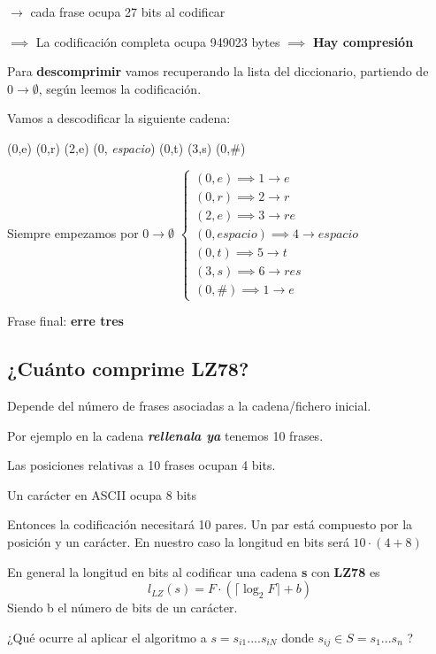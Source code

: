 $\rightarrow$  cada frase ocupa 27 bits al codificar

$\implies$ La codificación completa ocupa 949023 bytes $\implies$ \textbf{Hay compresión}

Para \textbf{descomprimir} vamos recuperando la lista del diccionario, partiendo de $0 \rightarrow \emptyset$, según leemos la codificación.

\begin{example}
Vamos a descodificar la siguiente cadena:

(0,e) (0,r) (2,e) (0, \textit{espacio}) (0,t) (3,s) (0,\#)

Siempre empezamos por $0 \rightarrow \emptyset$
$\begin{cases}
 (0,e) \implies 1 \rightarrow e\\
  (0,r) \implies 2 \rightarrow r\\ 
  (2,e) \implies 3 \rightarrow re\\
   (0, \textit{espacio}) \implies 4 \rightarrow \textit{espacio}\\
   (0,t) \implies 5 \rightarrow t\\
    (3,s) \implies 6 \rightarrow res\\
     (0,\#) \implies 1 \rightarrow e
\end{cases}$

Frase final: \textbf{erre tres}
\end{example}

\subsection{¿Cuánto comprime LZ78?}

Depende del número de frases asociadas a la cadena/fichero inicial.

Por ejemplo en la cadena \textbf{\textit{rellenala ya}} tenemos 10 frases.

Las posiciones relativas a 10 frases ocupan 4 bits.

Un carácter en ASCII ocupa 8 bits

Entonces la codificación necesitará 10 pares. Un par está compuesto por la posición y un carácter. En nuestro caso la longitud en bits será $10 \cdot (4 +8)$

En general la longitud en bits al codificar una cadena \textbf{s} con \textbf{LZ78} es
$$l_{LZ} (s) = F \cdot ( \lceil\log_2 F\rceil  + b)$$
Siendo b el número de bits de un carácter.


¿Qué ocurre al aplicar el algoritmo a $s = s_{i1}.... s_{iN}$ donde $s_{ij} \in S = {s_1...s_n}$ ?

